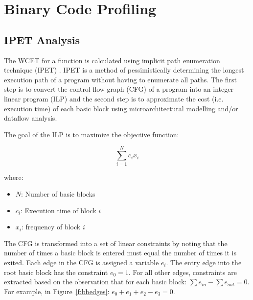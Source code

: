 
\chapter{Binary Code Profiling} %

\label{c:prof} %

\section{IPET Analysis}
The WCET for a function is calculated using implicit path enumeration technique (IPET) \cite{li1995performance}. IPET is a method of pessimistically determining the longest execution path of a program without having to enumerate all paths. The first step is to convert the control flow graph (CFG) of a program into an integer linear program (ILP) and the second step is to approximate the cost (i.e. execution time) of each basic block using microarchitectural modelling and/or dataflow analysis. 

The goal of the ILP is to maximize the objective function:

\begin{equation}
\sum_{i=1}^{N}c_ix_i
\end{equation}

where:

\begin{itemize}
  \item $N$: Number of basic blocks
  \item $c_i$: Execution time of block $i$
  \item $x_i$: frequency of block $i$
\end{itemize}

The CFG is transformed into a set of linear constraints by noting that the number of times a basic block is entered must equal the number of times it is exited. Each edge in the CFG is assigned a variable $e_i$. The entry edge into the root basic block has the constraint $e_0 = 1$. For all other edges, constraints are extracted based on the observation that for each basic block: $\sum e_{in} - \sum e_{out} = 0$. For example, in Figure~\ref{f:bbedges}: $e_0+e_1+e_2-e_3=0$.

